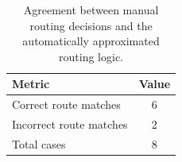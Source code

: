 \begin{table}[htbp]
\centering
\caption{Agreement between manual routing decisions and the automatically approximated routing logic.}
\label{tab:auto_routing_match}
\begin{tabular}{lc}
\toprule
Metric & Value \\
\midrule
Correct route matches & 6 \\
Incorrect route matches & 2 \\
Total cases & 8 \\
\bottomrule
\end{tabular}
\end{table}